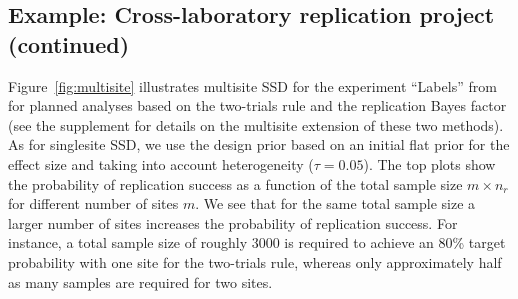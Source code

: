 \subsection{Example: Cross-laboratory replication project (continued)}
Figure~\ref{fig:multisite} illustrates multisite SSD for the experiment
``Labels'' from \citet{Protzko2020} for planned analyses based on the
two-trials rule and the replication Bayes factor (see the supplement for details
on the multisite extension of these two methods). As for singlesite SSD, we use
the design prior based on an initial flat prior for the effect size and taking
into account heterogeneity ($\tau = 0.05$). The top
plots show the probability of replication success as a function of the total
sample size $m \times n_{r}$ for different number of sites $m$. We see that for
the same total sample size a larger number of sites increases the probability of
replication success. For instance, a total sample size of roughly 3000 is
required to achieve an 80\% target probability with one site %
for the two-trials rule, whereas only approximately half as many samples are
required for two sites. %


